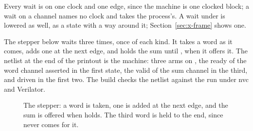 Every wait is on one clock and one edge, since the machine is one
clocked block; a wait on a channel names no clock and takes the
process's. A wait under  is lowered as well, as a state with
a way around it; Section~\ref{sec:x-frame} shows one.

The stepper below waits three times, once of each kind. It takes a
word as it comes, adds one at the next edge, and holds the sum until
, when it offers it. The netlist at the end of the printout
is the machine: three arms on , the ready of the word
channel asserted in the first state, the valid of the sum channel in
the third, and  driven in the first two. The build checks
the netlist against the run under nvc and Verilator.

\begin{figure}[htbp]
\centering

\caption{The stepper: a word is taken, one is added at the next
edge, and the sum is offered when  holds. The third word
is held to the end, since  never comes for it.}
\label{fig:x-seq}
\end{figure}




